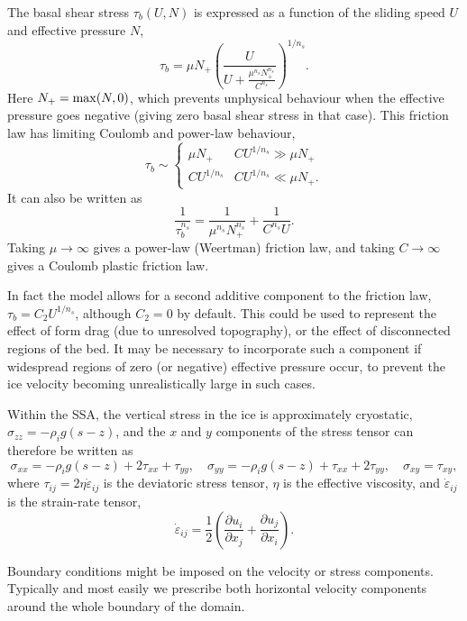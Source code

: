\documentclass[a4paper,11pt,fleqn]{article}
\newcommand{\be}{\begin{equation} }
\newcommand{\ee}{\end{equation}}
\newcommand{\eps}{\varepsilon}
\newcommand{\pd}[2]{\frac{\partial #1}{\partial #2}}
\begin{document}
{The basal shear stress $\tau_b(U,N)$ is expressed as a function of the sliding speed $U$ and effective pressure $N$, 
\be
\tau_b = \mu N_+ \left( \frac{U}{U + \frac{\mu^{n_s} N_+^{n_s}}{C^{n_s}}}\right)^{1/n_s}.
\ee
Here $N_+ = {\rm max}(N,0)$, which prevents unphysical behaviour when the effective pressure goes negative (giving zero basal shear stress in that case).  
This friction law has limiting Coulomb and power-law behaviour,
\be
\tau_b \sim \begin{cases}
\mu N_+ & C U^{1/n_s} \gg \mu N_+ \\
C U^{1/n_s} & C U^{1/n_s} \ll \mu N_+. 
\end{cases}
\ee
It can also be written as
\be
\frac{1}{\tau_b^{n_s}} = \frac{1}{\mu^{n_s}N_+^{n_s}} + \frac{1}{C^{n_s}U}.
\ee
Taking $\mu \to \infty$ gives a power-law (Weertman) friction law, and taking $C \to \infty$ gives a Coulomb plastic friction law.  

In fact the model allows for a second additive component to the friction law, $\tau_b = C_2 U^{1/n_s}$, although $C_2 = 0$ by default.  This could be used to represent the effect of form drag (due to unresolved topography), or the effect of disconnected regions of the bed.   It may be necessary to incorporate such a component if widespread regions of zero (or negative) effective pressure occur, to prevent the ice velocity becoming unrealistically large in such cases.

Within the SSA, the vertical stress in the ice is approximately cryostatic, $\sigma_{zz} = -\rho_i g (s-z)$, and the $x$ and $y$ components of the stress tensor can therefore be written as
\be
\sigma_{xx} = -\rho_i g (s-z) + 2\tau_{xx}+\tau_{yy}, \quad
\sigma_{yy} = -\rho_i g (s-z) + \tau_{xx}+2\tau_{yy}, \quad
\sigma_{xy} = \tau_{xy},
\ee
where $\tau_{ij} = 2 \eta \dot{\eps}_{ij}$ is the deviatoric stress tensor, $\eta$ is the effective viscosity, and $\dot{\eps}_{ij}$ is the strain-rate tensor,
\be \label{strainratetensor}
\dot{\eps}_{ij} = \frac{1}{2} \left( \pd{u_i}{x_j} + \pd{u_j}{x_i} \right).
\ee

Boundary conditions might be imposed on the velocity or stress components. Typically and most easily we prescribe both horizontal velocity components around the whole boundary of the domain. 

}
\end{document}
